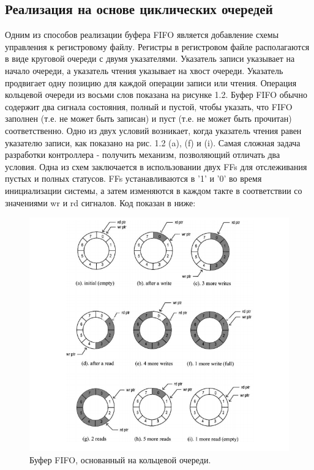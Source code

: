 \subsection{Реализация на основе циклических очередей}
Одним из способов реализации буфера FIFO является добавление схемы управления к регистровому файлу. Регистры в регистровом файле располагаются в виде круговой очереди с двумя указателями. Указатель записи указывает на начало очереди, а указатель чтения указывает на хвост очереди. Указатель продвигает одну позицию для каждой операции записи или чтения. Операция кольцевой очереди из восьми слов показана на рисунке 1.2.
	Буфер FIFO обычно содержит два сигнала состояния, полный и пустой, чтобы указать, что FIFO заполнен (т.е. не может быть записан) и пуст (т.е. не может быть прочитан) соответственно. Одно из двух условий возникает, когда указатель чтения равен указателю записи, как показано на рис. 1.2 (a), (f) и (i). Самая сложная задача разработки контроллера - получить механизм, позволяющий отличать два условия. Одна из схем заключается в использовании двух FFs для отслеживания пустых и полных статусов. FFs устанавливаются в '1' и '0' во время инициализации системы, а затем изменяются в каждом такте в соответствии со значениями wr и rd сигналов. Код показан в ниже:

\begin{figure}[h]
\centering
\includegraphics[width=1.1\textwidth]{circular_queue}
\caption{Буфер FIFO, основанный на кольцевой очереди.}
\label{circular_queue_label}
\end{figure}

